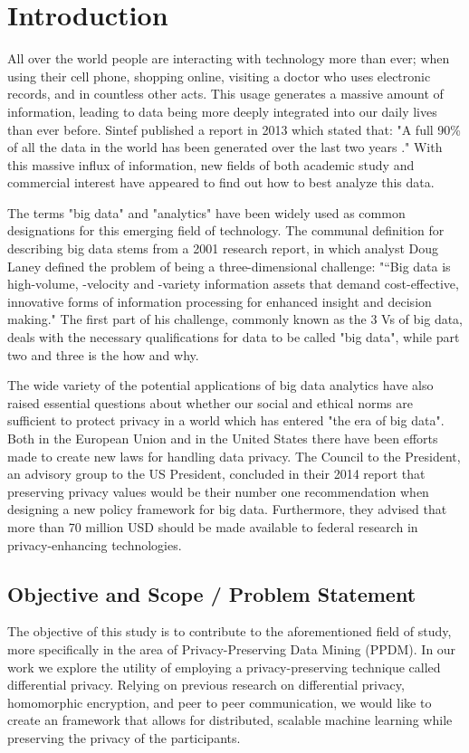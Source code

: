 
\chapter{Introduction}
All over the world people are interacting with technology more than ever; when using their cell phone, shopping online, visiting a doctor who uses electronic records, and in countless other acts. This usage generates a massive amount of information, leading to data being more deeply integrated into our daily lives than ever before. Sintef published a report in 2013 which stated that: "A full 90\% of all the data in the world has been generated over the last two years \citep{dragland2013big}." With this massive influx of information, new fields of both academic study and commercial interest have appeared to find out how to best analyze this data. 

The terms "big data" and "analytics" have been widely used as common designations for this emerging field of technology. The communal definition for describing big data stems from a 2001 research report\citep{laney2001dataVs}, in which analyst Doug Laney defined the problem of being a three-dimensional challenge: "“Big data is high-volume, -velocity and -variety information assets that demand cost-effective, innovative forms of information processing for enhanced insight and decision making." The first part of his challenge, commonly known as the 3 Vs of big data, deals with the necessary qualifications for data to be called "big data", while part two and three is the how and why.  
   
The wide variety of the potential applications of big data analytics have also raised essential questions about whether our social and ethical norms are sufficient to protect privacy in a world which has entered "the era of big data". Both in the European Union and in the United States there have been efforts made to create new laws for handling data privacy. The Council to the President, an advisory group to the US President, concluded in their 2014 report \citep{house2014bigdata} that preserving privacy values would be their number one recommendation when designing a new policy framework for big data. Furthermore, they advised that more than 70 million USD should be made available to federal research in privacy-enhancing technologies. 

\section{Objective and Scope / Problem Statement}
\label{sec:problem_statement}
The objective of this study is to contribute to the aforementioned field of study, more specifically in the area of Privacy-Preserving Data Mining (PPDM). In our work we explore the utility of employing a privacy-preserving technique called differential privacy. Relying on previous research on differential privacy, homomorphic encryption, and peer to peer communication, we would like to create an framework that allows for distributed, scalable machine learning while preserving the privacy of the participants. 

